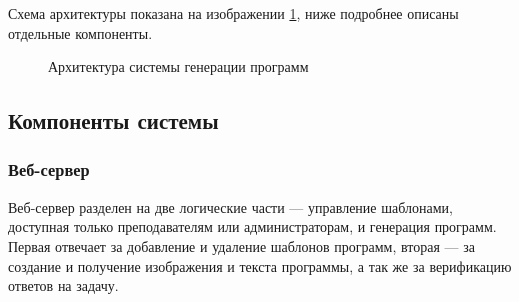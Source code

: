 Схема архитектуры показана на изображении \ref{architecture}, ниже подробнее описаны отдельные
компоненты.

\begin{figure}[ht]
    \begin{center}
        \caption{\label{architecture} Архитектура системы генерации программ}
    \end{center}
\end{figure}
\clearpage

\subsection{Компоненты системы}

\subsubsection{Веб-сервер}
Веб-сервер разделен на две логические части ---
управление шаблонами, доступная только преподавателям
или администраторам, и генерация программ. Первая отвечает
за добавление и удаление шаблонов программ, вторая --- за создание и получение изображения
и текста программы, а так же за верификацию ответов на задачу.

